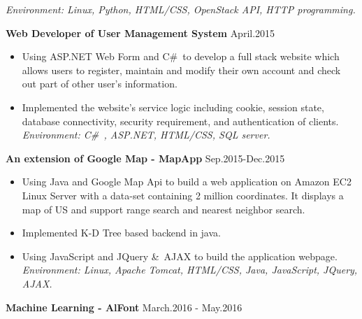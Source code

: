 \documentclass{resume} %
\begin{document}
\begin{spacing}{1}
\begin{center}
\begin{itemize}
\hspace{-9mm}\textit{Environment: Linux, Python,  HTML/CSS, OpenStack API, HTTP programming.}
\vspace{-1mm}
\end{itemize}
\vspace{-1mm}
{\bf Web Developer of User Management System} \hfill {\small  April.2015} \\
\vspace{-0mm}
\begin{itemize}
\item{Using ASP.NET Web Form and C\#\ to develop a full stack website which allows users to register, maintain and modify their own account and check out part of other user’s information.} \\
\item{Implemented the website's service logic including cookie, session state, database connectivity, security requirement, and authentication of clients.} \\
\hspace{-9mm}\textit{Environment: C\#\ , ASP.NET, HTML/CSS, SQL server.}
\vspace{-1mm}
\end{itemize}
\vspace{-1mm}
{\bf An extension of Google Map - MapApp} \hfill {\small  Sep.2015-Dec.2015} \\
\vspace{-0mm}
\begin{itemize}
\item{Using Java and Google Map Api to build a web application on Amazon EC2 Linux Server with a data-set containing 2 million coordinates. It displays a map of US and support range search and nearest neighbor search.} \\
\item{Implemented K-D Tree based backend in java.  } \\
\item{Using JavaScript and JQuery \&\ AJAX to build the application webpage.} \\
\hspace{-9mm}\textit{Environment: Linux, Apache Tomcat, HTML/CSS, Java, JavaScript, JQuery, AJAX.}
\vspace{-2mm}
\end{itemize}
{\bf Machine Learning - AlFont} \hfill {\small March.2016 - May.2016} \\
\vspace{-0mm}
\begin{itemize}

\end{itemize}
\end{center}
\end{spacing}
\end{document}

